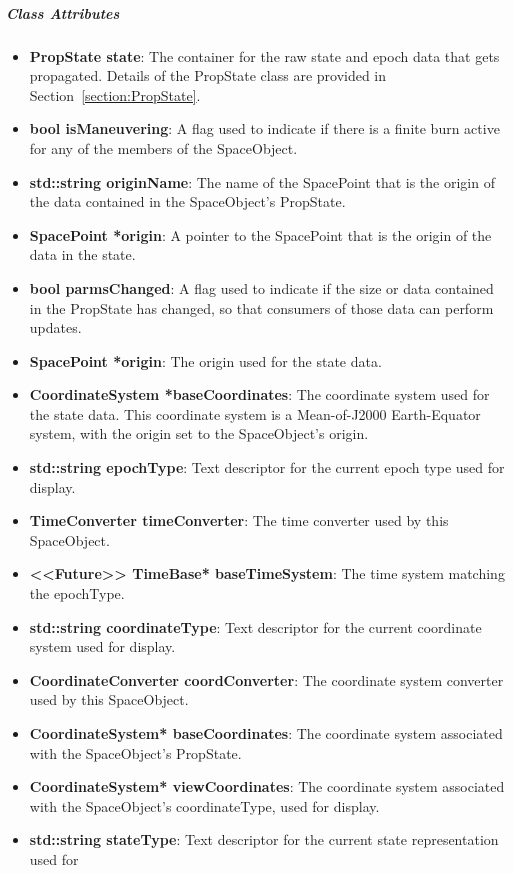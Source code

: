 \subparagraph{\textit{Class Attributes}}

\begin{itemize}
\item \textbf{PropState state}: The container for the raw state and epoch data that gets
propagated.  Details of the PropState class are provided in Section~\ref{section:PropState}.
\item \textbf{bool isManeuvering}: A flag used to indicate if there is a finite burn active for any
of the members of the SpaceObject.
\item \textbf{std::string originName}: The name of the SpacePoint that is the origin of the data
contained in the SpaceObject's PropState.
\item \textbf{SpacePoint *origin}: A pointer to the SpacePoint that is the origin of the data in
the state.
\item \textbf{bool parmsChanged}: A flag used to indicate if the size or data contained in the
PropState has changed, so that consumers of those data can perform updates.
\item \textbf{SpacePoint *origin}: The origin used for the state data.
\item \textbf{CoordinateSystem *baseCoordinates}: The coordinate system used for the state data.
This coordinate system is a Mean-of-J2000 Earth-Equator system, with the origin set to the
SpaceObject's origin.
\item \textbf{std::string epochType}:  Text descriptor for the current epoch type used for display.
\item \textbf{TimeConverter timeConverter}:  The time converter used by this SpaceObject.
\item \textbf{<<Future>> TimeBase* baseTimeSystem}: The time system matching the epochType.
\item \textbf{std::string coordinateType}: Text descriptor for the current coordinate system used
for display.
\item \textbf{CoordinateConverter coordConverter}:  The coordinate system converter used by this
SpaceObject.
\item \textbf{CoordinateSystem* baseCoordinates}: The coordinate system associated with the
SpaceObject's PropState.
\item \textbf{CoordinateSystem* viewCoordinates}: The coordinate system associated with the
SpaceObject's coordinateType, used for display.
\item \textbf{std::string stateType}: Text descriptor for the current state representation used for

\end{itemize}
